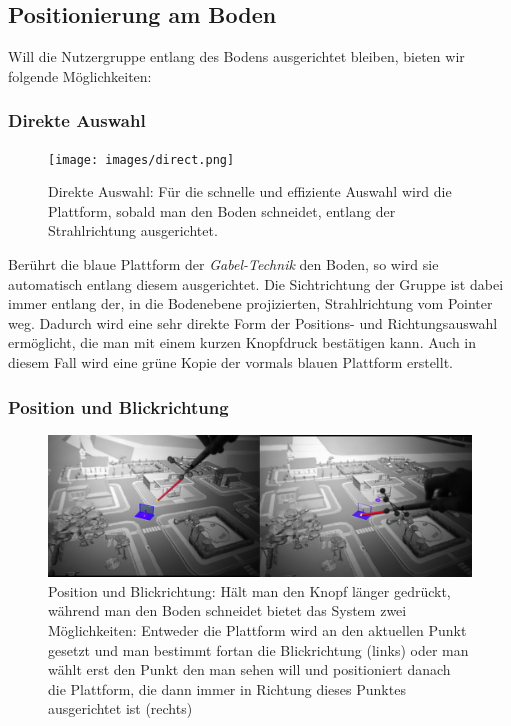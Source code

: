 \subsection{Positionierung am Boden}
Will die Nutzergruppe entlang des Bodens ausgerichtet bleiben, bieten wir folgende Möglichkeiten:

\subsubsection{Direkte Auswahl}

\begin{figure}[h]
  \centering
  \texttt{[image: images/direct.png]}
  \caption{Direkte Auswahl: Für die schnelle und effiziente Auswahl wird die Plattform, sobald man den Boden schneidet, entlang der Strahlrichtung ausgerichtet.}
  \label{fig:todo}
\end{figure}

Berührt die blaue Plattform der \textit{Gabel-Technik} den Boden, so wird sie automatisch entlang diesem ausgerichtet. Die Sichtrichtung der Gruppe ist dabei immer entlang der, in die Bodenebene projizierten, Strahlrichtung vom Pointer weg. Dadurch wird eine sehr direkte Form der Positions- und Richtungsauswahl ermöglicht, die man mit einem kurzen Knopfdruck bestätigen kann. Auch in diesem Fall wird eine grüne Kopie der vormals blauen Plattform erstellt.

\subsubsection{Position und Blickrichtung}

\begin{figure}[h]
  \centering
  \includegraphics[width=\textwidth]{images/look.jpg}
  \caption{Position und Blickrichtung: Hält man den Knopf länger gedrückt, während man den Boden schneidet bietet das System zwei Möglichkeiten: Entweder die Plattform wird an den aktuellen Punkt gesetzt und man bestimmt fortan die Blickrichtung (links) oder man wählt erst den Punkt den man sehen will und positioniert danach die Plattform, die dann immer in Richtung dieses Punktes ausgerichtet ist (rechts)}
  \label{fig:todo}
\end{figure}


